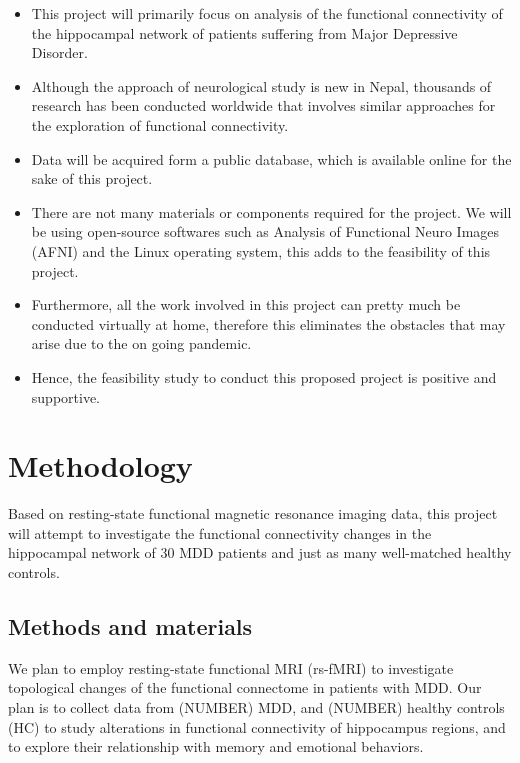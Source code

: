 \documentclass{article}
\begin{document}
\begin{itemize}

  \item This project will primarily focus on analysis of the
    functional connectivity of the hippocampal network of patients
    suffering from Major Depressive Disorder.

  \item Although the approach of neurological study is new in Nepal,
    thousands of research has been conducted worldwide that involves
    similar approaches for the exploration of functional connectivity.


  \item Data will be acquired form a public database, which is
    available online for the sake of this project.

  \item There are not many materials or components required for the
    project. We will be using open-source softwares such as Analysis
    of Functional Neuro Images (AFNI) and the Linux operating system,
    this adds to the feasibility of this project.

  \item Furthermore, all the work involved in this project can pretty
    much be conducted virtually at home, therefore this eliminates the
    obstacles that may arise due to the on going pandemic.

  \item Hence, the feasibility study to conduct this proposed project
    is positive and supportive.

\end{itemize}

\newpage

\section{Methodology}

Based on resting-state functional magnetic resonance imaging data,
this project will attempt to investigate the functional connectivity
changes in the hippocampal network of 30 MDD patients and just as many
well-matched healthy controls.

\subsection{Methods and materials}

We plan to employ resting-state functional MRI (rs-fMRI) to
investigate topological changes of the functional connectome in
patients with MDD. Our plan is to collect data from (NUMBER) MDD, and
(NUMBER) healthy controls (HC) to study alterations in functional
connectivity of hippocampus regions, and to explore their relationship
with memory and emotional behaviors.
\end{document}
